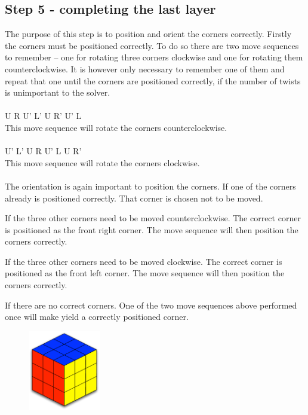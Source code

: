 \subsection{Step 5 - completing the last layer}\label{sub:step5}
The purpose of this step is to position and orient the corners correctly. Firstly the corners must be positioned correctly. To do so there are two move sequences to remember -- one for rotating three corners clockwise and one for rotating them counterclockwise. It is however only necessary to remember one of them and repeat that one until the corners are positioned correctly, if the number of twists is unimportant to the solver. \\
\\
U R U' L' U R' U' L
\\
This move sequence will rotate the corners counterclockwise.
\\
\\
U' L' U R U' L U R'
\\
This move sequence will rotate the corners clockwise.
\\
\\
The orientation is again important to position the corners. If one of the corners already is positioned correctly. That corner is chosen not to be moved. 

If the three other corners need to be moved counterclockwise. The correct corner is positioned as the front right corner. The move sequence will then position the corners correctly.

If the three other corners need to be moved clockwise. The correct corner is positioned as the front left corner. The move sequence will then position the corners correctly.

If there are no correct corners. One of the two move sequences above performed once will make yield a correctly positioned corner.

\begin{figure}
\begin{center}
	\includegraphics[width=0.28\textwidth]{input/pics/8done.pdf}	
\end{center}
\caption{}
\label{fig:8done}
\end{figure}

